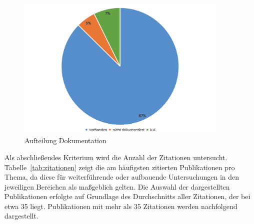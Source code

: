 \begin{figure}[!htbp]
    \centering
    \caption{Aufteilung Dokumentation}
    \label{fig:16-dokumentation}
    \includegraphics[width=0.90\textwidth]{graphics_lit/16-dokumentation.png}
\end{figure}

Als abschließendes Kriterium wird die Anzahl der Zitationen untersucht. Tabelle~\ref{tab:zitationen} zeigt die am häufigsten zitierten Publikationen pro Thema, da diese für weiterführende oder aufbauende Untersuchungen in den jeweiligen Bereichen als maßgeblich gelten. Die Auswahl der dargestellten Publikationen erfolgte auf Grundlage des Durchschnitts aller Zitationen, der bei etwa 35 liegt. Publikationen mit mehr als 35 Zitationen werden nachfolgend dargestellt.

